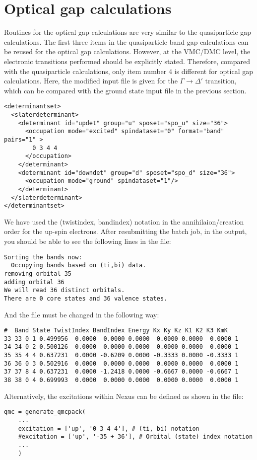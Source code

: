 \section{Optical gap calculations}
Routines for the optical gap calculations are very similar to the quasiparticle gap calculations. 
The first three items in the quasiparticle band gap calculations can be reused for the optical gap calculations. 
However, at the VMC/DMC level, the electronic transitions performed should be explicitly stated. 
Therefore, compared with the quasiparticle calculations, only item number 4 is different for optical gap calculations. 
Here, the modified input file is given for the $\Gamma\rightarrow\Delta'$ transition, which can be compared with the ground state input file in the previous section. 
\begin{lstlisting}[style=QMCPXML]
<determinantset>
  <slaterdeterminant>
    <determinant id="updet" group="u" sposet="spo_u" size="36">
      <occupation mode="excited" spindataset="0" format="band" pairs="1" >
        0 3 4 4
      </occupation>
    </determinant>
    <determinant id="downdet" group="d" sposet="spo_d" size="36">
      <occupation mode="ground" spindataset="1"/>	
    </determinant>
  </slaterdeterminant>
</determinantset>
\end{lstlisting}
We have used the (twistindex, bandindex) notation in the annihilaion/creation order for the up-spin electrons.
After resubmitting the batch job, in the output, you should be able to see the following lines in the  file:
\begin{lstlisting}[style=SHELL]
Sorting the bands now:
  Occupying bands based on (ti,bi) data.
removing orbital 35
adding orbital 36
We will read 36 distinct orbitals.
There are 0 core states and 36 valence states.
\end{lstlisting}
And the  file must be changed in the following way: 
\begin{lstlisting}[style=SHELL]
#  Band State TwistIndex BandIndex Energy Kx Ky Kz K1 K2 K3 KmK
33 33 0	1 0.499956	0.0000  0.0000 0.0000  0.0000 0.0000  0.0000 1
34 34 0	2 0.500126	0.0000  0.0000 0.0000  0.0000 0.0000  0.0000 1
35 35 4	4 0.637231	0.0000 -0.6209 0.0000 -0.3333 0.0000 -0.3333 1
36 36 0	3 0.502916	0.0000  0.0000 0.0000  0.0000 0.0000  0.0000 1
37 37 8	4 0.637231	0.0000 -1.2418 0.0000 -0.6667 0.0000 -0.6667 1
38 38 0	4 0.699993	0.0000  0.0000 0.0000  0.0000 0.0000  0.0000 1
\end{lstlisting}
Alternatively, the excitations within Nexus can be defined as shown in the  file:
\begin{lstlisting}[style=Python]
qmc = generate_qmcpack(
    ...
    excitation = ['up', '0 3 4 4'], # (ti, bi) notation
    #excitation = ['up', '-35 + 36'], # Orbital (state) index notation
    ...
    )
\end{lstlisting}

